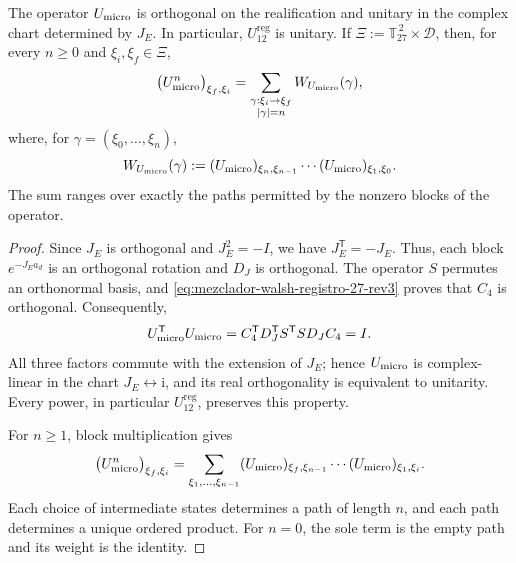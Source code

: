 \begin{proposition}
\label{prop:unitariedad-suma-registro-27-rev3}
The operator \(U_{\rm micro}\) is orthogonal on the realification and unitary
in the complex chart determined by \(J_E\). In particular,
\(U_{12}^{\mathrm{reg}}\) is unitary. If
\(\Xi:=\mathbb T_{27}^{\,2}\times\mathcal D\), then, for every
\(n\geq0\) and \(\xi_i,\xi_f\in\Xi\),
\[
 \bigl(U_{\rm micro}^{n}\bigr)_{\xi_f,\xi_i}
 =
 \sum_{\substack{\gamma:\xi_i\to\xi_f\\|\gamma|=n}}
 W_{U_{\rm micro}}(\gamma),
\]
where, for \(\gamma=(\xi_0,\ldots,\xi_n)\),
\[
 W_{U_{\rm micro}}(\gamma)
 :=
 (U_{\rm micro})_{\xi_n,\xi_{n-1}}
 \cdots
 (U_{\rm micro})_{\xi_1,\xi_0}.
\]
The sum ranges over exactly the paths permitted by the nonzero blocks
of the operator.
\end{proposition}

\begin{proof}
Since \(J_E\) is orthogonal and \(J_E^2=-I\), we have
\(J_E^{\mathsf T}=-J_E\). Thus, each block
\(e^{-J_Ea_d}\) is an orthogonal rotation and \(D_J\) is orthogonal.
The operator \(S\) permutes an orthonormal basis, and
\eqref{eq:mezclador-walsh-registro-27-rev3} proves that \(C_4\) is
orthogonal. Consequently,
\[
 U_{\rm micro}^{\mathsf T}U_{\rm micro}
 =C_4^{\mathsf T}D_J^{\mathsf T}S^{\mathsf T}
   S D_JC_4
 =I.
\]
All three factors commute with the extension of \(J_E\); hence
\(U_{\rm micro}\) is complex-linear in the chart \(J_E\leftrightarrow\mathrm i\), and its real
orthogonality is equivalent to unitarity. Every power, in particular
\(U_{12}^{\mathrm{reg}}\), preserves this property.

For \(n\geq1\), block multiplication gives
\[
 \bigl(U_{\rm micro}^{n}\bigr)_{\xi_f,\xi_i}
 =
 \sum_{\xi_1,\ldots,\xi_{n-1}}
 (U_{\rm micro})_{\xi_f,\xi_{n-1}}
 \cdots
 (U_{\rm micro})_{\xi_1,\xi_i}.
\]
Each choice of intermediate states determines a path of length \(n\),
and each path determines a unique ordered product. For \(n=0\), the sole
term is the empty path and its weight is the identity.
\end{proof}

